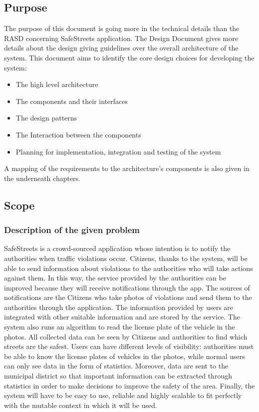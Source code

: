 
\subsection{Purpose}
The purpose of this document is going more in the technical details than the RASD concerning SafeStreets application.
\newline
The Design Document gives more details about the design giving guidelines over the overall architecture of the system.
This document  aims to identify the core design choices for developing the system:
\begin{itemize}
\item The high level architecture
\item The components and their interfaces
\item The design patterns
\item The Interaction between the components
\item Planning for implementation, integration and testing of the system
\end{itemize}
A mapping of the requirements to the architecture's components is also given in the underneath chapters. 

\subsection{Scope}
\subsubsection{Description of the given problem}
SafeStreets is a crowd-sourced application whose intention is to notify the authorities when traffic
violations occur. Citizens, thanks to the system, will be able to send information about violations to the
authorities who will take actions against them. In this way, the service provided by the authorities can be
improved because they will receive notifications through the app. The sources of notifications are the
Citizens who take photos of violations and send them to the authorities through
the application. The information provided by users are integrated with other suitable information and are
stored by the service. The system also runs an algorithm to read the license plate of the vehicle in the
photos. All collected data can be seen by Citizens and authorities to find which streets are the safest.
Users can have different levels of visibility: authorities must be able to know the license plates of vehicles
in the photos, while normal users can only see data in the form of statistics. Moreover, data are sent to
the municipal district so that important information can be extracted through statistics in order to make
decisions to improve the safety of the area. Finally, the system will have to be easy to use, reliable
and highly scalable to fit perfectly with the mutable context in which it will be used.


